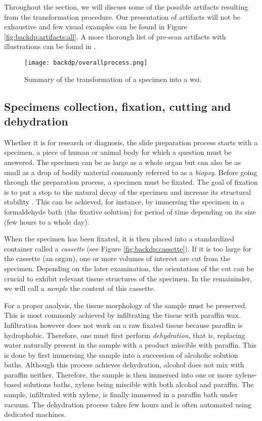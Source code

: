 Throughout the section, we will discuss some of the possible artifacts resulting from the transformation procedure. Our presentation of artifacts will not be exhaustive and few visual examples can be found in Figure \ref{fig:backdp:artifacts:all}. A more thorough list of pre-scan artifacts with illustrations can be found in \cite{taqi2018review}.

\begin{figure}
  \centering
  \texttt{[image: backdp/overallprocess.png]}
  \caption{Summary of the transformation of a specimen into a \acrlong{wsi}.}
  \label{fig:backdp:overallprocess}
\end{figure}

\subsection{Specimens collection, fixation, cutting and dehydration}

Whether it is for research or diagnosis, the slide preparation process starts with a specimen, a piece of human or animal body for which a question must be answered. The specimen can be as large as a whole organ but can also be as small as a drop of bodily material commonly referred to as a \textit{biopsy}. Before going through the preparation process, a specimen must be fixated. The goal of fixation is to put a stop to the natural decay of the specimen and increase its structural stability \cite{rolls2012process}. This can be achieved, for instance, by immersing the specimen in a formaldehyde bath (\ie the fixative solution) for period of time depending on its size (\ie few hours to a whole day). 

When the specimen has been fixated, it is then placed into a standardized container called a \textit{cassette} (see Figure \ref{fig:backdp:cassette}). If it is too large for the cassette (\eg an organ), one or more volumes of interest are cut from the specimen. Depending on the later examination, the orientation of the cut can be crucial to exhibit relevant tissue structures of the specimen. In the remaininder, we will call a \textit{sample} the content of this cassette.

For a proper analysis, the tissue morphology of the sample must be preserved. This is most commonly achieved by infiltrating the tissue with paraffin wax. Infiltration however does not work on a raw fixated tissue because paraffin is hydrophobic. Therefore, one must first perform \textit{dehydration}, that is, replacing water naturally present in the sample with a product miscible with paraffin. This is done by first immersing the sample into a succession of alcoholic solution baths. Although this process achieves dehydration, alcohol does not mix with paraffin neither. Therefore, the sample is then immersed into one or more xylene-based solutions baths, xylene being miscible with both alcohol and paraffin. The sample, infiltrated with xylene, is finally immersed in a paraffin bath under vacuum. The dehydration process takes few hours and is often automated using dedicated machines.

